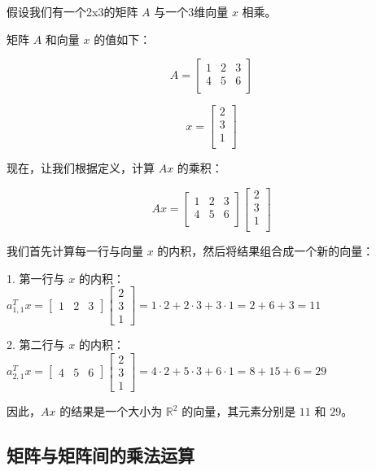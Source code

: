 \documentclass[lang=cn,newtx,10pt,scheme=chinese]{elegantbook}
\begin{document}
\begin{exercise}
    假设我们有一个2x3的矩阵 $A$ 与一个3维向量 $x$ 相乘。

矩阵 $A$ 和向量 $x$ 的值如下：

\[
A = \begin{bmatrix}
1 & 2 & 3 \\
4 & 5 & 6 \\
\end{bmatrix}
\]

\[
x = \begin{bmatrix}
2 \\
3 \\
1 \\
\end{bmatrix}
\]

现在，让我们根据定义，计算 $Ax$ 的乘积：

\[
Ax = \begin{bmatrix}
1 & 2 & 3 \\
4 & 5 & 6 \\
\end{bmatrix} \begin{bmatrix}
2 \\
3 \\
1 \\
\end{bmatrix}
\]

我们首先计算每一行与向量 $x$ 的内积，然后将结果组合成一个新的向量：

1. 第一行与 $x$ 的内积： $a_{1,1}^T x = \begin{bmatrix} 1 & 2 & 3 \end{bmatrix} \begin{bmatrix} 2 \\ 3 \\ 1 \end{bmatrix} = 1 \cdot 2 + 2 \cdot 3 + 3 \cdot 1 = 2 + 6 + 3 = 11$

2. 第二行与 $x$ 的内积： $a_{2,1}^T x = \begin{bmatrix} 4 & 5 & 6 \end{bmatrix} \begin{bmatrix} 2 \\ 3 \\ 1 \end{bmatrix} = 4 \cdot 2 + 5 \cdot 3 + 6 \cdot 1 = 8 + 15 + 6 = 29$

因此，$Ax$ 的结果是一个大小为 $\mathbb{R}^2$ 的向量，其元素分别是 $11$ 和 $29$。
\end{exercise}

\subsection{矩阵与矩阵间的乘法运算}
\end{document}
